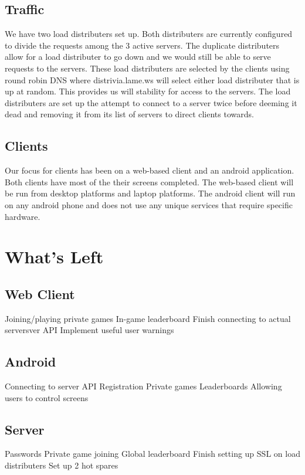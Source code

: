 \documentclass{dependencies/acm_proc_article-sp}
\begin{document}
\subsection {Traffic}
We have two load distributers set up. Both distributers are currently
configured to divide the requests among the 3 active servers. The duplicate
distributers allow for a load distributer to go down and we would still be able
to serve requests to the servers. These load distributers are selected by the
clients using round robin DNS where distrivia.lame.ws will select either load
distributer that is up at random. This provides us will stability for access to
the servers. The load distributers are set up the attempt to connect to a
server twice before deeming it dead and removing it from its list of servers to
direct clients towards.

\subsection {Clients}
Our focus for clients has been on a web-based client and an android
application. Both clients have most of the their screens completed. The
web-based client will be run from desktop platforms and laptop platforms. The
android client will run on any android phone and does not use any unique
services that require specific hardware.

\section{What's Left}
\subsection{Web Client}
Joining/playing private games
In-game leaderboard
Finish connecting to actual serversver API
Implement useful user warnings

\subsection{Android}
Connecting to server API
Registration
Private games
Leaderboards
Allowing users to control screens

\subsection{Server}
Passwords
Private game joining
Global leaderboard
Finish setting up SSL on load distributers
Set up 2 hot spares
\end{document}
